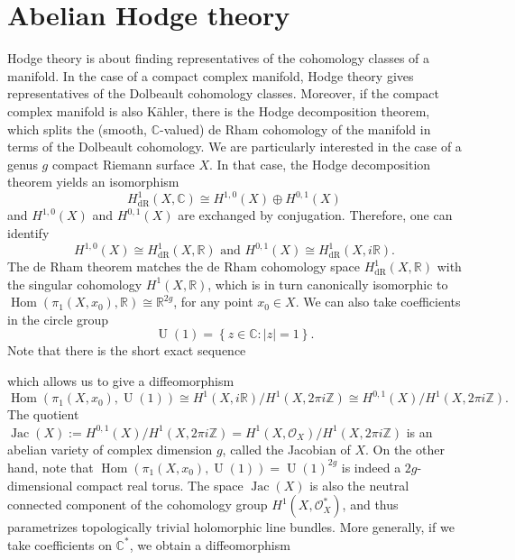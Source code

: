\documentclass[12pt,a4paper]{amsbook}
\theoremstyle{remark} \newtheorem{rmk}[thm]{Remark}
\theoremstyle{definition} \newtheorem{defn}[thm]{Definition}
\theoremstyle{definition} \newtheorem{ex}[thm]{Example}
\theoremstyle{definition} \newtheorem{ej}{Exercise}
\newcommand{\C}{\mathbb C}
\newcommand{\Z}{\mathbb Z}
\newcommand{\bbR}{\mathbb R}
\newcommand{\sO}{\mathscr O}
\newcommand{\dR}{\mathrm{dR}}
\DeclareMathOperator{\Hom}{Hom}
\DeclareMathOperator{\Jac}{Jac}
\DeclareMathOperator{\U}{U}
\begin{document}
\section{Abelian Hodge theory}
Hodge theory is about finding representatives of the cohomology classes of a manifold. In the case of a compact complex manifold, Hodge theory gives representatives of the Dolbeault cohomology classes. Moreover, if the compact complex manifold is also Kähler, there is the Hodge decomposition theorem, which splits the (smooth, $\C$-valued) de Rham cohomology of the manifold in terms of the Dolbeault cohomology. We are particularly interested in the case of a genus $g$ compact Riemann surface $X$. In that case, the Hodge decomposition theorem yields an isomorphism
\begin{equation*}
H^1_{\dR}(X,\C) \cong H^{1,0}(X) \oplus H^{0,1}(X)
\end{equation*}
and $H^{1,0}(X)$ and $H^{0,1}(X)$ are exchanged by conjugation. Therefore, one can identify
\begin{equation} \label{eq:abelian-hodge}
H^{1,0}(X) \cong H^1_{\dR}(X,\bbR) \text{ and } H^{0,1}(X)\cong H^1_{\dR}(X,i\bbR).
\end{equation}
The de Rham theorem matches the de Rham cohomology space $H^1_{\dR}(X,\bbR)$ with the singular cohomology $H^1(X,\bbR)$, which is in turn canonically isomorphic to $\Hom(\pi_1(X,x_0),\bbR)\cong \bbR^{2g}$, for any point $x_0\in X$. We can also take coefficients in the circle group
\begin{equation*}
\U(1)= \left\{ z\in \C : |z|=1 \right\}.
\end{equation*}
Note that there is the short exact sequence
\begin{center}
\end{center}
which allows us to give a diffeomorphism
\begin{equation} \label{eq:abelianNS}
\Hom(\pi_1(X,x_0),\U(1)) \cong H^1(X,i\bbR)/H^1(X,2\pi i \Z) \cong H^{0,1}(X)/H^1(X,2\pi i \Z).
\end{equation}
The quotient $\Jac(X):= H^{0,1}(X)/H^1(X,2\pi i \Z) = H^1(X,\sO_X)/H^1(X,2\pi i \Z)$ is an abelian variety of complex dimension $g$, called the Jacobian of $X$. On the other hand, note that $\Hom(\pi_1(X,x_0),\U(1))=\U(1)^{2g}$ is indeed a $2g$-dimensional compact real torus. The space $\Jac(X)$ is also the neutral connected component of the cohomology group $H^1(X,\sO_X^*)$, and thus parametrizes topologically trivial holomorphic line bundles. More generally, if we take coefficients on $\C^*$, we obtain a diffeomorphism
\end{document}
